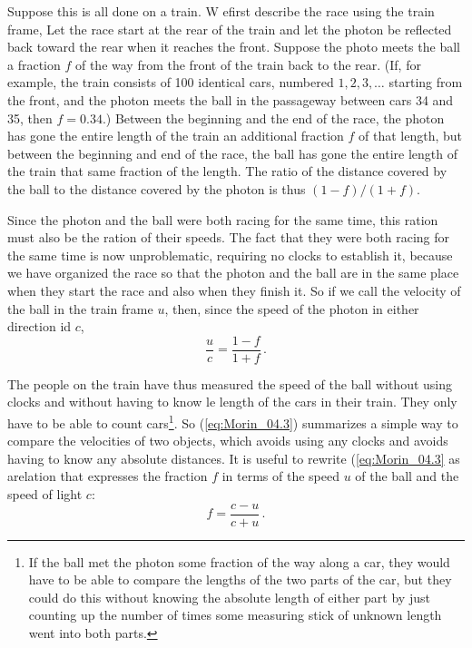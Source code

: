 Suppose this is all done on a train. W efirst describe the race using the train frame, Let the race start at the rear of the train and let the photon be reflected back toward the rear when it reaches the front. Suppose the photo meets the ball a fraction $f$ of the way from the front of the train back to the rear. (If, for example, the train consists of 100 identical cars, numbered $1,2,3,\ldots$ starting from the front, and the photon meets the ball in the passageway between cars 34 and 35, then $f = 0.34$.) Between the beginning and the end of the race, the photon has gone the entire length of the train  an additional fraction $f$ of that length, but between the beginning and end of the race, the ball has gone the entire length of the train  that same fraction of the length. The ratio of the distance covered by the ball to the distance covered by the photon is thus $(1 - f)/(1 + f)$.

Since the photon and the ball were both racing for the same time, this ration must also be the ration of their speeds. The fact that they were both racing for the same time is now unproblematic, requiring no clocks to establish it, because we have organized the race so that the photon and the ball are in the same place when they start the race and also when they finish it. So if we call the velocity of the ball in the train frame $u$, then, since the speed of the photon in either direction id $c$, 
\begin{equation}\label{eq:Morin_04.3}
\frac{u}{c} = \frac{1 - f}{1 + f}\,.
\end{equation}

The people on the train have thus measured the speed of the ball without using clocks and without having to know le length of the cars in their train. They only have to be able to count cars\footnote{If the ball met the photon some fraction of the way along a car, they would have to be able to compare the lengths of the two parts of the car, but they could do this without knowing the absolute length of either part by just counting up the number of times some measuring stick of unknown length went into both parts.}. So (\ref{eq:Morin_04.3}) summarizes a simple way to compare the velocities of two objects, which avoids using any clocks and avoids having to know any absolute distances. It is useful to rewrite (\ref{eq:Morin_04.3} as arelation that expresses the fraction $f$ in terms of the speed $u$ of the ball and the speed of light $c$:
\begin{equation}\label{eq:Morin_04.4}
f = \frac{c - u}{c + u}\,.
\end{equation}

